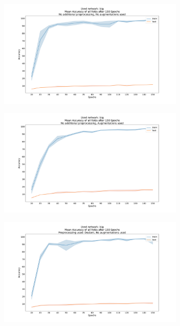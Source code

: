 \documentclass{article}
\begin{document}
\begin{minipage}[H]{1\linewidth}
\vspace{-30mm}


\begin{figure}[H]
	\begin{adjustwidth}{-8em}{-8em}
	\centering
    \begin{subfigure}{0.7\textwidth}
        \centering
        \includegraphics[width=\textwidth]{Standard_big_150_acc}
    \end{subfigure}
    \begin{subfigure}{0.7\textwidth}
        \centering
        \includegraphics[width=\textwidth]{Standard_big_150_augmentations_acc}
    \end{subfigure}
    \begin{subfigure}{0.7\textwidth}
        \centering
        \includegraphics[width=\textwidth]{Deslant_big_150_acc}

\end{subfigure}
\end{adjustwidth}
\end{figure}
\end{minipage}
\end{document}
